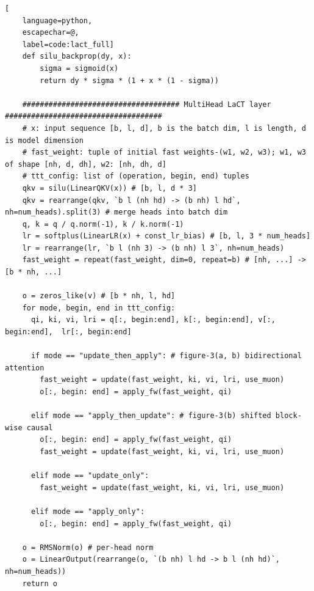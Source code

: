 \begin{algorithm}[p]
\begin{lstlisting}[
    language=python,
    escapechar=@,
    label=code:lact_full]
    def silu_backprop(dy, x):
        sigma = sigmoid(x)
        return dy * sigma * (1 + x * (1 - sigma))

    #################################### MultiHead LaCT layer ####################################
    # x: input sequence [b, l, d], b is the batch dim, l is length, d is model dimension
    # fast_weight: tuple of initial fast weights-(w1, w2, w3); w1, w3 of shape [nh, d, dh], w2: [nh, dh, d]
    # ttt_config: list of (operation, begin, end) tuples
    qkv = silu(LinearQKV(x)) # [b, l, d * 3]
    qkv = rearrange(qkv, `b l (nh hd) -> (b nh) l hd`, nh=num_heads).split(3) # merge heads into batch dim
    q, k = q / q.norm(-1), k / k.norm(-1)
    lr = softplus(LinearLR(x) + const_lr_bias) # [b, l, 3 * num_heads]
    lr = rearrange(lr, `b l (nh 3) -> (b nh) l 3`, nh=num_heads)
    fast_weight = repeat(fast_weight, dim=0, repeat=b) # [nh, ...] -> [b * nh, ...]
    
    o = zeros_like(v) # [b * nh, l, hd]
    for mode, begin, end in ttt_config:
      qi, ki, vi, lri = q[:, begin:end], k[:, begin:end], v[:, begin:end],  lr[:, begin:end]
      
      if mode == "update_then_apply": # figure-3(a, b) bidirectional attention
        fast_weight = update(fast_weight, ki, vi, lri, use_muon)
        o[:, begin: end] = apply_fw(fast_weight, qi)
        
      elif mode == "apply_then_update": # figure-3(b) shifted block-wise causal
        o[:, begin: end] = apply_fw(fast_weight, qi)
        fast_weight = update(fast_weight, ki, vi, lri, use_muon)

      elif mode == "update_only":
        fast_weight = update(fast_weight, ki, vi, lri, use_muon)
      
      elif mode == "apply_only":
        o[:, begin: end] = apply_fw(fast_weight, qi)

    o = RMSNorm(o) # per-head norm
    o = LinearOutput(rearrange(o, `(b nh) l hd -> b l (nh hd)`, nh=num_heads))
    return o
\end{lstlisting}
\end{algorithm}




